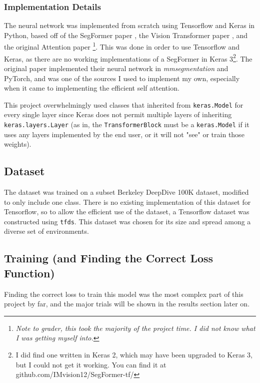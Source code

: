 \documentclass[12pt]{article}
\begin{document}
    \subsubsection*{Implementation Details}

    The neural network was implemented from scratch using Tensorflow and Keras in Python, based off of the SegFormer paper \cite{DBLP:journals/corr/abs-2105-15203}, the Vision Transformer paper \cite{ DBLP:journals/corr/abs-2010-11929}, and the original Attention paper \cite{DBLP:journals/corr/VaswaniSPUJGKP17}\footnote{\textit{Note to grader, this took the majority of the project time. I did not know what I was getting myself into.}}. This was done in order to use Tensorflow and Keras, as there are no working implementations of a SegFormer in Keras 3\footnote{I did find one written in Keras 2, which may have been upgraded to Keras 3, but I could not get it working. You can find it at github.com/IMvision12/SegFormer-tf/}. The original paper implemented their neural network in \textit{mmsegmentation} and PyTorch, and was one of the sources I used to implement my own, especially when it came to implementing the efficient self attention.

    This project overwhelmingly used classes that inherited from \texttt{keras.Model} for every single layer since Keras does not permit multiple layers of inheriting \texttt{keras.layers.Layer} (as in, the \texttt{TransformerBlock} must be a \texttt{keras.Model} if it uses any layers implemented by the end user, or it will not "see" or train those weights).


    \subsection*{Dataset}

    The dataset was trained on a subset Berkeley DeepDive 100K dataset, modified to only include one class. There is no existing implementation of this dataset for Tensorflow, so to allow the efficient use of the dataset, a Tensorflow dataset was constructed using \texttt{tfds}. This dataset was chosen for its size and spread among a diverse set of environments.

    \subsection*{Training (and Finding the Correct Loss Function)}

    Finding the correct loss to train this model was the most complex part of this project by far, and the major trials will be shown in the results section later on.
\end{document}
